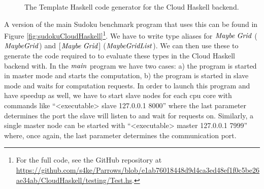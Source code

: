 \documentclass[paper=A4,twoside=true,openright,parskip=full,chapterprefix=true,headings=normal,bibliography=totoc,listof=totoc,titlepage=on,captions=tableabove,draft=false,british]{scrreprt}%
\renewcommand{\enquote}[1]{{``}#1{''}}
\begin{document}
\begin{figure}[th]
\resethooks
\caption{The Template Haskell code generator for the Cloud Haskell backend.}\label{fig:evalGen}\end{figure}

A version of the main Sudoku benchmark program that uses this can be
found in Figure \ref{fig:sudokuCloudHaskell}\footnote{For the full code,
  see the GitHub repository at
  \url{https://github.com/s4ke/Parrows/blob/e1ab76018448d9d4ca3ed48ef1f0c5be26ae34ab/CloudHaskell/testing/Test.hs}.}.
We have to write type aliases for \ensuremath{\Conid{Maybe}\;\Conid{Grid}} (\ensuremath{\Conid{MaybeGrid}}) and
\ensuremath{[\mskip1.5mu \Conid{Maybe}\;\Conid{Grid}\mskip1.5mu]} (\ensuremath{\Conid{MaybeGridList}}). We can then use these to generate the
code required to to evaluate these types in the Cloud Haskell backend
with. In the \ensuremath{\Varid{main}} program we have two cases: a) the program is started
in master mode and starts the computation, b) the program is started in
slave mode and waits for computation requests. In order to launch this
program and have speedup as well, we have to start slave nodes for each
cpu core with commands like \enquote{<executable> slave 127.0.0.1 8000}
where the last parameter determines the port the slave will listen to
and wait for requests on. Similarly, a single master node can be started
with \enquote{<executable> master 127.0.0.1 7999} where, once again, the
last parameter determines the communication port.
\end{document}
